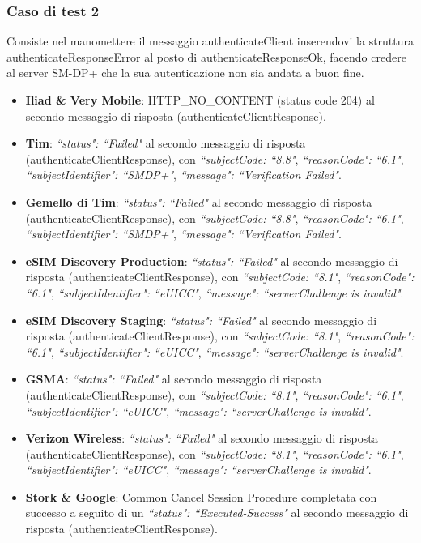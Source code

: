 \documentclass[10pt, oneside]{book}
\begin{document}
\subsubsection{Caso di test 2}
Consiste nel manomettere il messaggio authenticateClient inserendovi la struttura authenticateResponseError al posto di authenticateResponseOk, facendo credere al server SM-DP+ che la sua autenticazione non sia andata a buon fine.
\begin{itemize}
\item \textbf{Iliad \& Very Mobile}: HTTP\_NO\_CONTENT (status code 204) al secondo messaggio di risposta (authenticateClientResponse).
\item \textbf{Tim}: \textit{``status": ``Failed"} al secondo messaggio di risposta (authenticateClientResponse), con \textit{``subjectCode: ``8.8"}, \textit{``reasonCode": ``6.1"}, \textit{``subjectIdentifier": ``SMDP+"}, \textit{``message": ``Verification Failed"}.
\item \textbf{Gemello di Tim}: \textit{``status": ``Failed"} al secondo messaggio di risposta (authenticateClientResponse), con \textit{``subjectCode: ``8.8"}, \textit{``reasonCode": ``6.1"}, \textit{``subjectIdentifier": ``SMDP+"}, \textit{``message": ``Verification Failed"}.
\item \textbf{eSIM Discovery Production}: \textit{``status": ``Failed"} al secondo messaggio di risposta (authenticateClientResponse), con \textit{``subjectCode: ``8.1"}, \textit{``reasonCode": ``6.1"}, \textit{``subjectIdentifier": ``eUICC"}, \textit{``message": ``serverChallenge is invalid"}.
\item \textbf{eSIM Discovery Staging}: \textit{``status": ``Failed"} al secondo messaggio di risposta (authenticateClientResponse), con \textit{``subjectCode: ``8.1"}, \textit{``reasonCode": ``6.1"}, \textit{``subjectIdentifier": ``eUICC"}, \textit{``message": ``serverChallenge is invalid"}.
\item \textbf{GSMA}: \textit{``status": ``Failed"} al secondo messaggio di risposta (authenticateClientResponse), con \textit{``subjectCode: ``8.1"}, \textit{``reasonCode": ``6.1"}, \textit{``subjectIdentifier": ``eUICC"}, \textit{``message": ``serverChallenge is invalid"}.
\item \textbf{Verizon Wireless}: \textit{``status": ``Failed"} al secondo messaggio di risposta (authenticateClientResponse), con \textit{``subjectCode: ``8.1"}, \textit{``reasonCode": ``6.1"}, \textit{``subjectIdentifier": ``eUICC"}, \textit{``message": ``serverChallenge is invalid"}.
\item \textbf{Stork \& Google}: Common Cancel Session Procedure completata con successo a seguito di un \textit{``status": ``Executed-Success"} al secondo messaggio di risposta (authenticateClientResponse).

\end{itemize}
\end{document}
